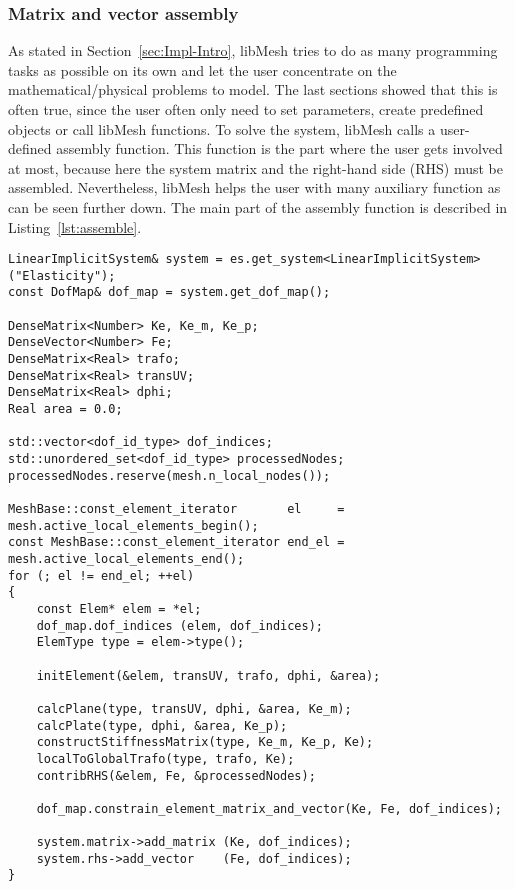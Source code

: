    
  \subsubsection{Matrix and vector assembly}\label{sec:Impl-Details-Assembly}
  As stated in Section~\ref{sec:Impl-Intro}, libMesh tries to do as many programming tasks as possible on its own and let the user concentrate on the mathematical/physical problems to model. The last sections showed that this is often true, since the user often only need to set parameters, create predefined objects or call libMesh functions. To solve the system, libMesh calls a user-defined assembly function. This function is the part where the user gets involved at most, because here the system matrix and the right-hand side (RHS) must be assembled. Nevertheless, libMesh helps the user with many auxiliary function as can be seen further down. The main part of the assembly function is described in Listing~\ref{lst:assemble}.
\begin{lstlisting}[caption=Assemble System Matrix and RHS,label=lst:assemble,float]
LinearImplicitSystem& system = es.get_system<LinearImplicitSystem>("Elasticity");
const DofMap& dof_map = system.get_dof_map();

DenseMatrix<Number> Ke, Ke_m, Ke_p;
DenseVector<Number> Fe;
DenseMatrix<Real> trafo;
DenseMatrix<Real> transUV;
DenseMatrix<Real> dphi;
Real area = 0.0;

std::vector<dof_id_type> dof_indices;
std::unordered_set<dof_id_type> processedNodes;
processedNodes.reserve(mesh.n_local_nodes());

MeshBase::const_element_iterator       el     = mesh.active_local_elements_begin();
const MeshBase::const_element_iterator end_el = mesh.active_local_elements_end();
for (; el != end_el; ++el)
{
	const Elem* elem = *el;
	dof_map.dof_indices (elem, dof_indices);
	ElemType type = elem->type();

	initElement(&elem, transUV, trafo, dphi, &area);

	calcPlane(type, transUV, dphi, &area, Ke_m);
	calcPlate(type, dphi, &area, Ke_p);
	constructStiffnessMatrix(type, Ke_m, Ke_p, Ke);
	localToGlobalTrafo(type, trafo, Ke);
	contribRHS(&elem, Fe, &processedNodes);

	dof_map.constrain_element_matrix_and_vector(Ke, Fe, dof_indices);

	system.matrix->add_matrix (Ke, dof_indices);
	system.rhs->add_vector    (Fe, dof_indices);
}
\end{lstlisting}
